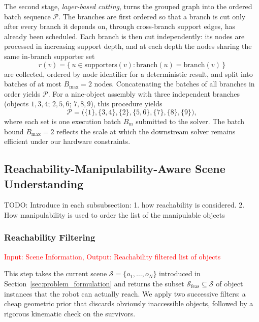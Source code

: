 \documentclass[journal]{IEEEtran}
\newcommand{\todo}[1]{{\color{red}TODO: #1}}
\begin{document}
The second stage, \emph{layer-based cutting}, turns the grouped graph into
the ordered batch sequence $\mathcal{P}$. The branches are first ordered so
that a branch is cut only after every branch it depends on, through
cross-branch support edges, has already been scheduled. Each branch is then
cut independently: its nodes are processed in increasing support depth, and
at each depth the nodes sharing the same in-branch supporter set
\begin{equation}
  r(v) = \{\, u \in \mathrm{supporters}(v) : \mathrm{branch}(u)=\mathrm{branch}(v) \,\}
  \label{eq:role}
\end{equation}
are collected, ordered by node identifier for a deterministic result, and
split into batches of at most $B_{\max}=2$ nodes. Concatenating the batches
of all branches in order yields $\mathcal{P}$. For a nine-object assembly
with three independent branches (objects $1,3,4$; $2,5,6$; $7,8,9$), this
procedure yields
\begin{equation}
  \mathcal{P} = \big(\{1\},\{3,4\},\{2\},\{5,6\},\{7\},\{8\},\{9\}\big),
  \label{eq:plan_example}
\end{equation}
where each set is one execution batch $B_m$ submitted to the solver. The
batch bound $B_{\max}=2$ reflects the scale at which the downstream solver
remains efficient under our hardware constraints.

\subsection{Reachability-Manipulability-Aware Scene Understanding}
\label{sec:scene_understanding}

\todo{Introduce in each subsubsection: 1. how reachability is considered. 2. How manipulability is used to order the list of the manipulable objects}

\subsubsection{Reachability Filtering}
\textcolor{red}{Input: Scene Information, Output: Reachability filtered list of objects}

This step takes the current scene $\mathcal{S}=\{o_1,\dots,o_N\}$ introduced
in Section~\ref{sec:problem_formulation} and returns the subset
$\mathcal{S}_{\mathrm{feas}}\subseteq\mathcal{S}$ of object instances that
the robot can actually reach. We apply two successive filters: a cheap
geometric prior that discards obviously inaccessible objects, followed by a
rigorous kinematic check on the survivors.
\end{document}
